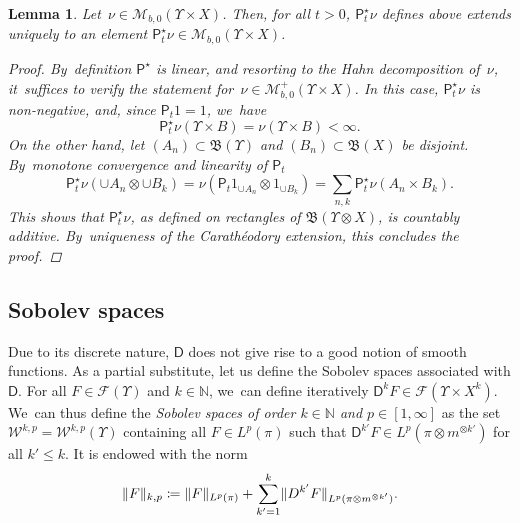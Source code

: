 \documentclass[10pt]{amsart}
\newtheorem{lemma}[theorem]{Lemma}
\theoremstyle{definition}
\theoremstyle{remark}
\DeclarePairedDelimiter{\norm}{\lVert}{\rVert}
\begin{document}
\begin{lemma}\label{l:countableAdditivity}
Let~$\nu\in \mathscr{M}_{b,0}(\varUpsilon \times X)$.
Then, for all $t > 0$, $\mathsf{P}^{\star}_{t} \nu$ defines above extends uniquely to an element $\mathsf{P}^{\star}_t\nu \in \mathscr{M}_{b,0}(\varUpsilon \times X)$.

\begin{proof}
By~definition $\mathsf{P}^{\star}$ is linear, and resorting to the Hahn decomposition of~$\nu$, it~suffices to verify the statement for~$\nu\in \mathscr{M}_{b,0}^+(\varUpsilon \times X)$.
In this case, $\mathsf{P}_{t}^{\star} \nu$ is non-negative, and, since $\mathsf{P}_{t}1 =1$, we~have
\begin{equation*}
\mathsf{P}_{t}^{\star}\nu(\varUpsilon \times B) = \nu(\varUpsilon \times B) < \infty.
\end{equation*}
On the other hand, let $(A_{n}) \subset \mathfrak{B}(\varUpsilon)$ and $(B_{n}) \subset \mathfrak{B}(X)$ be disjoint.
By~monotone convergence and linearity of $\mathsf{P}_{t}$
\begin{equation*}
\mathsf{P}_{t}^{\star}\nu(\cup A_{n} \otimes \cup B_{k}) = \nu(\mathsf{P}_{t} 1_{\cup A_{n}} \otimes 1_{\cup B_{k}}) = \sum_{n,k} \mathsf{P}_{t}^{\star}\nu(A_{n} \times B_{k}).
\end{equation*}
This shows that $\mathsf{P}_{t}^{\star}\nu$, as defined on rectangles of $\mathfrak{B}(\varUpsilon \otimes X)$, is countably additive.
By~uniqueness of the Carathéodory extension, this concludes the proof.
\end{proof}
\end{lemma}

\subsection{Sobolev spaces}

Due to its discrete nature, $\mathsf{D}$ does not give rise to a good notion of smooth functions.
As a partial substitute, let us define the Sobolev spaces associated with $\mathsf{D}$.
For all $F \in \mathscr{F}(\varUpsilon)$ and $k \in \mathbb{N}$, we~can define iteratively $\mathsf{D}^{k} F \in \mathscr{F}(\varUpsilon \times X^{k})$. We~can thus define the \emph{Sobolev spaces of order $k \in \mathbb{N}$ and $p \in [1,\infty]$} as the set $\mathscr{W}^{k,p} = \mathscr{W}^{k,p}(\varUpsilon)$ containing all $F \in L^{p}(\pi)$ such that $\mathsf{D}^{k'} F \in L^{p}(\pi \otimes m^{\otimes k'})$ for all $k' \leq k$.
It is endowed with the norm
\begin{equation*}
\norm{F}_{k,p} \coloneq \norm{F}_{L^{p}(\pi)} + \sum_{k'=1}^{k} \norm{D^{k'}F}_{L^{p}(\pi \otimes m^{\otimes k'})}.
\end{equation*}
\end{document}
